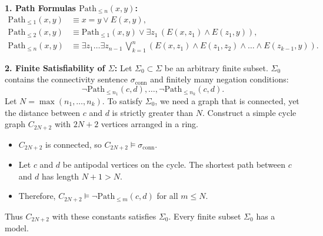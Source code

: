 \begin{tabletworkspace}[5.0cm]
\end{tabletworkspace}

\begin{solution}
\textbf{1. Path Formulas $\mathrm{Path}_{\le n}(x, y)$:}
\begin{align*}
\mathrm{Path}_{\le 1}(x, y) &\equiv x = y \lor E(x, y), \\
\mathrm{Path}_{\le 2}(x, y) &\equiv \mathrm{Path}_{\le 1}(x, y) \lor \exists z_1\, (E(x, z_1) \land E(z_1, y)), \\
\mathrm{Path}_{\le n}(x, y) &\equiv \exists z_1 \dots \exists z_{n-1}\, \bigvee_{k=1}^n \left( E(x, z_1) \land E(z_1, z_2) \land \dots \land E(z_{k-1}, y) \right).
\end{align*}

\textbf{2. Finite Satisfiability of $\Sigma$:}
Let $\Sigma_0 \subset \Sigma$ be an arbitrary finite subset.
$\Sigma_0$ contains the connectivity sentence $\sigma_{\mathrm{conn}}$ and finitely many negation conditions:
\[
\neg \mathrm{Path}_{\le n_1}(c, d), \dots, \neg \mathrm{Path}_{\le n_k}(c, d).
\]
Let $N = \max(n_1, \dots, n_k)$.
To satisfy $\Sigma_0$, we need a graph that is connected, yet the distance between $c$ and $d$ is strictly greater than $N$.
Construct a simple cycle graph $C_{2N+2}$ with $2N + 2$ vertices arranged in a ring.
\begin{itemize}[leftmargin=1.4em,itemsep=2pt]
  \item $C_{2N+2}$ is connected, so $C_{2N+2} \models \sigma_{\mathrm{conn}}$.
  \item Let $c$ and $d$ be antipodal vertices on the cycle. The shortest path between $c$ and $d$ has length $N + 1 > N$.
  \item Therefore, $C_{2N+2} \models \neg \mathrm{Path}_{\le m}(c, d)$ for all $m \le N$.
\end{itemize}
Thus $C_{2N+2}$ with these constants satisfies $\Sigma_0$. Every finite subset $\Sigma_0$ has a model.


\end{solution}
